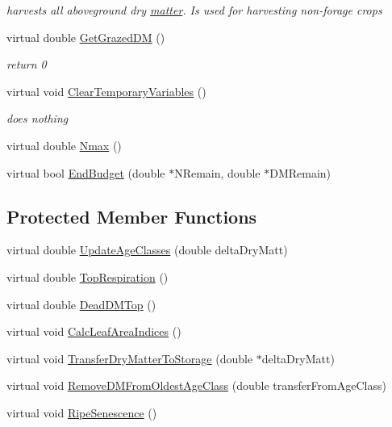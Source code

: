 \begin{DoxyCompactItemize}
\begin{DoxyCompactList}\small\item\em harvests all aboveground dry \hyperlink{classmatter}{matter}. Is used for harvesting non-\/forage crops \item\end{DoxyCompactList}\item 
virtual double \hyperlink{classcrop_ryegrass_a02c5bec33e0f0a6240c34dde03a09e01}{GetGrazedDM} ()
\begin{DoxyCompactList}\small\item\em return 0 \item\end{DoxyCompactList}\item 
virtual void \hyperlink{classcrop_ryegrass_a8c524dccd76c81476124974e3e486a33}{ClearTemporaryVariables} ()
\begin{DoxyCompactList}\small\item\em does nothing \item\end{DoxyCompactList}\item 
virtual double \hyperlink{classcrop_ryegrass_aac89498ebd762c28e8bed76ec7c78db0}{Nmax} ()
\item 
virtual bool \hyperlink{classcrop_ryegrass_a5bb3f7b2ad5805e527bea21bbb71531c}{EndBudget} (double $\ast$NRemain, double $\ast$DMRemain)
\end{DoxyCompactItemize}
\subsection*{Protected Member Functions}
\begin{DoxyCompactItemize}
\item 
virtual double \hyperlink{classcrop_ryegrass_a0e2ec4857ca4630c5a9df02e8cd72b72}{UpdateAgeClasses} (double deltaDryMatt)
\item 
virtual double \hyperlink{classcrop_ryegrass_a81ee410c4677a88854065d2cbcecf4fc}{TopRespiration} ()
\item 
virtual double \hyperlink{classcrop_ryegrass_aebf12683e5eb4d3a672808a2e3ab147c}{DeadDMTop} ()
\item 
virtual void \hyperlink{classcrop_ryegrass_a573d23b1d622e156001cae5c45203bc0}{CalcLeafAreaIndices} ()
\item 
virtual void \hyperlink{classcrop_ryegrass_a41ff7bdc52b0466a4598e104b4723572}{TransferDryMatterToStorage} (double $\ast$deltaDryMatt)
\item 
virtual void \hyperlink{classcrop_ryegrass_aa5b4bfccf6d06ebf0058b3348255e840}{RemoveDMFromOldestAgeClass} (double transferFromAgeClass)
\item 
virtual void \hyperlink{classcrop_ryegrass_a65e6d648842b070c8dfe343d548dee1c}{RipeSenescence} ()
\end{DoxyCompactItemize}
